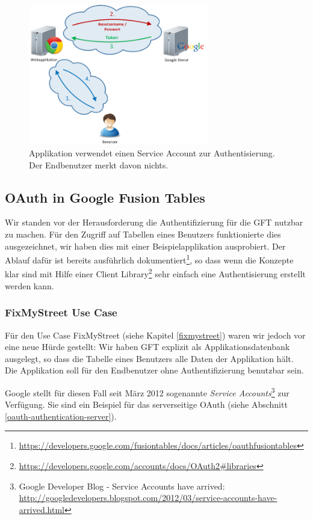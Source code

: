 \begin{figure}[!ht]
	\centering
	\includegraphics[width=0.7\textwidth]{images/oauth/oauth-serviceaccount}
	\caption{Applikation verwendet einen Service Account zur Authentisierung. Der Endbenutzer merkt davon nichts.}
	\label{oauth-serviceaccount}
\end{figure}

\subsection{OAuth in Google Fusion Tables}
Wir standen vor der Herausforderung die Authentifizierung für die GFT nutzbar zu machen. Für den Zugriff auf Tabellen eines Benutzers funktionierte dies ausgezeichnet, wir haben dies mit einer Beispielapplikation ausprobiert. Der Ablauf dafür ist bereits ausführlich dokumentiert\footnote{\url{https://developers.google.com/fusiontables/docs/articles/oauthfusiontables}}, so dass wenn die Konzepte klar sind mit Hilfe einer Client Library\footnote{\url{https://developers.google.com/accounts/docs/OAuth2\#libraries}} sehr einfach eine Authentisierung erstellt werden kann.

\subsubsection{FixMyStreet Use Case}
Für den Use Case FixMyStreet (siehe Kapitel \ref{fixmystreet}) waren wir jedoch vor eine neue Hürde gestellt: Wir haben GFT explizit als Applikationsdatenbank ausgelegt, so dass die Tabelle eines Benutzers alle Daten der Applikation hält. Die Applikation soll für den Endbenutzer ohne Authentifizierung benutzbar sein.

Google stellt für diesen Fall seit März 2012 sogenannte \emph{Service Accounts}\footnote{Google Developer Blog - Service Accounts have arrived: \url{http://googledevelopers.blogspot.com/2012/03/service-accounts-have-arrived.html}} zur Verfügung. Sie sind ein Beispiel für das serverseitige \gls{OAuth} (siehe Abschnitt \ref{oauth-authentication-server}).

